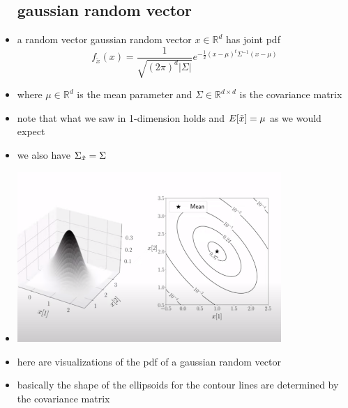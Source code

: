 \documentclass{article}
\begin{document}
\begin{itemize}
\subsection*{gaussian random vector}
\item a random vector gaussian random vector $x\in \mathbb{R}^{d}$ has joint pdf $$f_{\tilde{x}}(x)=\frac{1}{\sqrt{(2\pi)^d|\Sigma
|}}e^{-\frac{1}{2}(x-\mu)^t\Sigma^{-1}(x-\mu)}$$
\item where $\mu\in \mathbb{R}^d$ is the mean parameter and $\Sigma\in \mathbb{R}^{d\times d }$ is the covariance matrix 
\item note that what we saw in 1-dimension holds and $E[\Tilde{x}]=\mu$ as we would expect
\item we also have $\Sigma_{\Tilde{x}}=\Sigma$
\item \includegraphics[width=10cm]{notes/week_8/vedio_1/images/v1_1.png}
\item here are visualizations of the pdf of a gaussian random vector 
\item basically the shape of the ellipsoids for the contour lines are determined by the covariance matrix

\end{itemize}
\end{document}
